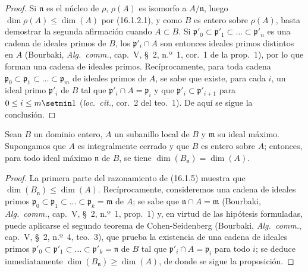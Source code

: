 \begin{proof}
Si $\mathfrak{n}$ es el núcleo de $\rho$, $\rho(A)$ es isomorfo a
$A/\mathfrak{n}$, luego $\dim\rho(A)\leq\dim(A)$ por (16.1.2.1), y como $B$
es entero sobre $\rho(A)$, basta demostrar la segunda afirmación cuando
$A\subset B$. Si
$\mathfrak{p}'_0\subset\mathfrak{p}'_1\subset\ldots\subset\mathfrak{p}'_n$
es una cadena de ideales primos de $B$, los $\mathfrak{p}'_i\cap A$ son
entonces ideales primos distintos en $A$ (Bourbaki, \emph{Alg.~comm.}, cap.~V,
\S~2, n.º~1, cor.~1 de la prop.~1), por lo que forman una cadena de ideales
primos. Recíprocamente, para toda cadena
$\mathfrak{p}_0\subset\mathfrak{p}_1\subset\ldots\subset\mathfrak{p}_m$
de ideales primos de $A$, se sabe que existe, para cada $i$, un ideal primo
$\mathfrak{p}'_i$ de $B$ tal que $\mathfrak{p}'_i\cap A=\mathfrak{p}_i$ y que
$\mathfrak{p}'_i\subset\mathfrak{p}'_{i+1}$ para $0\leq i\leq m\setmin 1$
(\emph{loc.~cit.}, cor.~2 del teo.~1). De aquí se sigue la conclusión.
\end{proof}

\begin{proposition}[16.1.6]
\label{0.16.1.6-es}
Sean $B$ un dominio entero, $A$ un subanillo local de $B$ y $\mathfrak{m}$ su
ideal máximo. Supongamos que $A$ es integralmente cerrado y que $B$ es entero
sobre $A$; entonces, para todo ideal máximo $\mathfrak{n}$ de $B$, se tiene
$\dim(B_{\mathfrak{n}})=\dim(A)$.
\end{proposition}

\begin{proof}
La primera parte del razonamiento de (16.1.5) muestra que
$\dim(B_{\mathfrak{n}})\leq\dim(A)$. Recíprocamente, consideremos una cadena
de ideales primos
$\mathfrak{p}_0\subset\mathfrak{p}_1\subset\ldots\subset
\mathfrak{p}_k=\mathfrak{m}$ de $A$; se sabe que
$\mathfrak{n}\cap A=\mathfrak{m}$ (Bourbaki, \emph{Alg.~comm.}, cap.~V,
\S~2, n.º~1, prop.~1) y, en virtud de las hipótesis formuladas, puede aplicarse
el segundo teorema de Cohen-Seidenberg (Bourbaki, \emph{Alg.~comm.}, cap.~V,
\S~2, n.º~4, teo.~3), que prueba la existencia de una cadena de ideales primos
$\mathfrak{p}'_0\subset\mathfrak{p}'_1\subset\ldots\subset
\mathfrak{p}'_k=\mathfrak{n}$ de $B$ tal que
$\mathfrak{p}'_i\cap A=\mathfrak{p}_i$ para todo $i$; se deduce inmediatamente
$\dim(B_{\mathfrak{n}})\geq\dim(A)$, de donde se sigue la proposición.
\end{proof}

